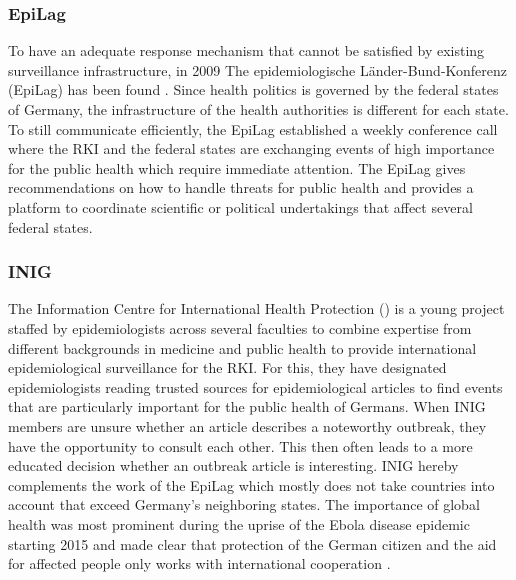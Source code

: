 \subsubsection{EpiLag}
To have an adequate response mechanism that cannot be satisfied by existing surveillance infrastructure, in 2009 The epidemiologische L\"ander-Bund-Konferenz (\gls{EpiLag}) has been found \citep{Mohr2010}. Since health politics is governed by the federal states of Germany, the infrastructure of the health authorities is different for each state. To still communicate efficiently, the EpiLag established a weekly conference call where the RKI and the federal states are exchanging events of high importance for the public health which require immediate attention. The EpiLag gives recommendations on how to handle threats for public health and provides a platform to coordinate scientific or political undertakings that affect several federal states.

\subsubsection{INIG}
The Information Centre for International Health Protection () is a young project staffed by epidemiologists across several faculties to combine expertise from different backgrounds in medicine and public health to provide international epidemiological surveillance for the RKI. For this, they have designated epidemiologists reading trusted sources for epidemiological articles to find events that are particularly important for the public health of Germans. When INIG members are unsure whether an article describes a noteworthy outbreak, they have the opportunity to consult each other. This then often leads to a more educated decision whether an outbreak article is interesting. INIG hereby complements the work of the EpiLag which mostly does not take countries into account that exceed Germany's neighboring states. The importance of global health was most prominent during the uprise of the Ebola disease epidemic starting 2015 and made clear that protection of the German citizen and the aid for affected people only works with international cooperation \citep{Grohe2017}.

